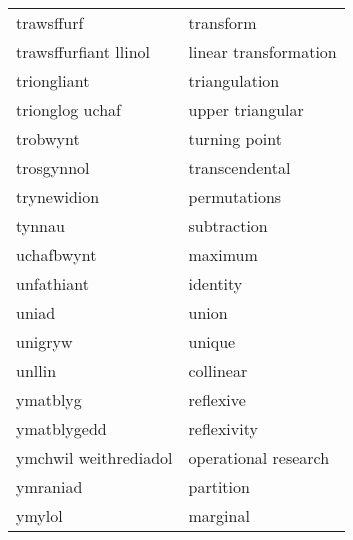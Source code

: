 \begin{supertabular}{p{0.22\textwidth}p{0.22\textwidth}}
                      trawsffurf &                         transform \\
           trawsffurfiant llinol &             linear transformation \\
                     triongliant &                     triangulation \\
                 trionglog uchaf &                  upper triangular \\
                        trobwynt &                     turning point \\
                      trosgynnol &                    transcendental \\
                     trynewidion &                      permutations \\
                          tynnau &                       subtraction \\
                      uchafbwynt &                           maximum \\
                      unfathiant &                          identity \\
                           uniad &                             union \\
                         unigryw &                            unique \\
                          unllin &                         collinear \\
                        ymatblyg &                         reflexive \\
                     ymatblygedd &                       reflexivity \\
           ymchwil weithrediadol &              operational research \\
                        ymraniad &                         partition \\
                          ymylol &                          marginal \\
\end{supertabular}
